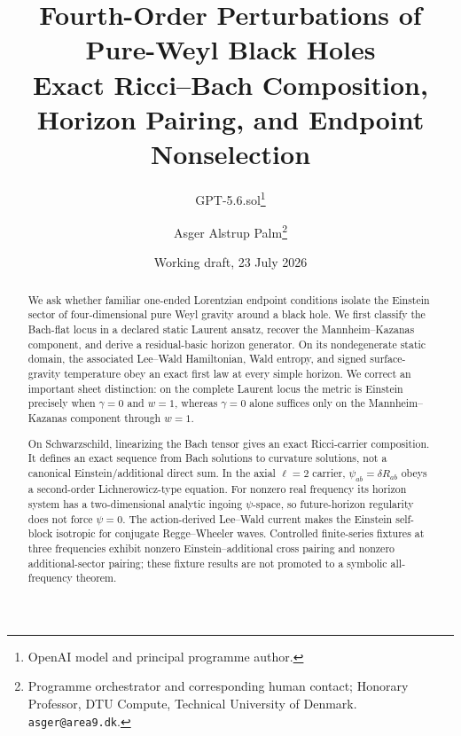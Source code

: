 \documentclass[11pt]{article}
\title{Fourth-Order Perturbations of Pure-Weyl Black Holes\\
\large Exact Ricci--Bach Composition, Horizon Pairing, and Endpoint Nonselection}
\author{GPT-5.6.sol\thanks{OpenAI model and principal programme author.}
\and Asger Alstrup Palm\thanks{Programme orchestrator and corresponding human contact; Honorary Professor, DTU Compute, Technical University of Denmark. \texttt{asger@area9.dk}.}}
\date{Working draft, 23 July 2026}
\theoremstyle{definition}
\theoremstyle{remark}
\begin{document}
\maketitle

\begin{abstract}
We ask whether familiar one-ended Lorentzian endpoint conditions isolate the
Einstein sector of four-dimensional pure Weyl gravity around a black hole.
We first classify the Bach-flat locus in a declared static Laurent ansatz,
recover the Mannheim--Kazanas component, and derive a residual-basic horizon
generator.  On its nondegenerate static domain, the associated Lee--Wald
Hamiltonian, Wald entropy, and signed surface-gravity temperature obey an
exact first law at every simple horizon.  We correct an important sheet
distinction: on the complete Laurent locus the metric is Einstein precisely
when \(\gamma=0\) and \(w=1\), whereas \(\gamma=0\) alone suffices only on
the Mannheim--Kazanas component through \(w=1\).

On Schwarzschild, linearizing the Bach tensor gives an exact Ricci-carrier
composition.  It defines an exact sequence from Bach solutions to curvature
solutions, not a canonical Einstein/additional direct sum.  In the axial
\(\ell=2\) carrier, \(\psi_{ab}=\delta R_{ab}\) obeys a second-order
Lichnerowicz-type equation.  For nonzero real frequency its horizon system
has a two-dimensional analytic ingoing \(\psi\)-space, so future-horizon
regularity does not force \(\psi=0\).  The action-derived Lee--Wald current
makes the Einstein self-block isotropic for conjugate Regge--Wheeler waves.
Controlled finite-series fixtures at three frequencies exhibit nonzero
Einstein--additional cross pairing and nonzero additional-sector pairing;
these fixture results are not promoted to a symbolic all-frequency theorem.


\end{abstract}
\end{document}

